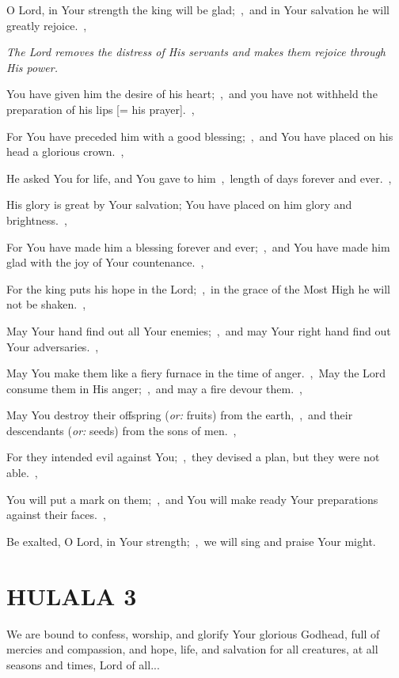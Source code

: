 \documentclass[12pt,twoside,a5paper]{article}
\newcommand{\hulala}[1]{\section*{HULALA {#1}}}
\newcommand{\qanona}[1]{{\liturgicalhint{Qanona.} \emph{#1}}}
\newcommand{\slota}[1]{\liturgicalhint{Slota.} #1}
\newcommand{\translationoption}[1]{\emph{or:} #1}
\begin{document}
\begin{normalparskip}
  O Lord, in Your strength the king will be glad;~\sep\ and in Your salvation he will greatly rejoice.~\sep

  \qanona{The Lord removes the distress of His servants and makes them rejoice through His power.}

  You have given him the desire of his heart;~\sep\ and you have not withheld the preparation of his lips [= his prayer].~\sep

  For You have preceded him with a good blessing;~\sep\ and You have placed on his head a glorious crown.~\sep

  He asked You for life, and You gave to him~\sep\ length of days forever and ever.~\sep

  His glory is great by Your salvation; You have placed on him glory and brightness.~\sep

  For You have made him a blessing forever and ever;~\sep\ and You have made him glad with the joy of Your countenance.~\sep

  For the king puts his hope in the Lord;~\sep\ in the grace of the Most High he will not be shaken.~\sep

  May Your hand find out all Your enemies;~\sep\ and may Your right hand find out Your adversaries.~\sep

  May You make them like a fiery furnace in the time of anger.~\sep\ May the Lord consume them in His anger;~\sep\ and may a fire devour them.~\sep

  May You destroy their offspring (\translationoption{fruits}) from the earth,~\sep\ and their descendants (\translationoption{seeds}) from the sons of men.~\sep

  For they intended evil against You;~\sep\ they devised a plan, but they were not able.~\sep

  You will put a mark on them;~\sep\ and You will make ready Your preparations against their faces.~\sep

  Be exalted, O Lord, in Your strength;~\sep\ we will sing and praise Your might.
\end{normalparskip}


\hulala{3}

\slota{We are bound to confess, worship, and glorify Your glorious Godhead, full of mercies and compassion, and hope, life, and salvation for all creatures, at all seasons and times, Lord of all...}
\end{document}
